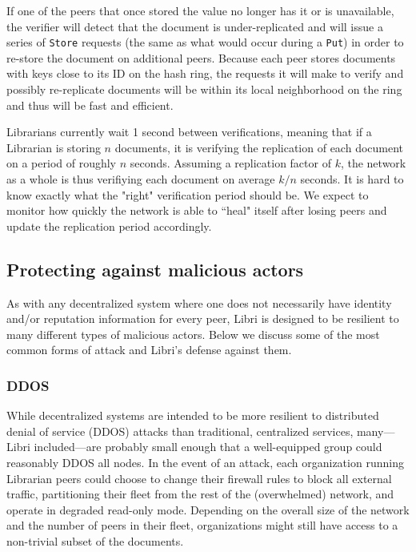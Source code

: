 \documentclass[10pt]{article}
\newcommand{\ttt}[1]{\texttt{#1}}
\begin{document}
If one of the peers that once stored the value no longer has it or is unavailable, the verifier will detect that the document is under-replicated and will issue a series of \ttt{Store} requests (the same as what would occur during a \texttt{Put}) in order to re-store the document on additional peers. Because each peer stores documents with keys close to its ID on the hash ring, the requests it will make to verify and possibly re-replicate documents will be within its local neighborhood on the ring and thus will be fast and efficient.

Librarians currently wait 1 second between verifications, meaning that if a Librarian is storing $n$ documents, it is verifying the replication of each document on a period of roughly $n$ seconds. Assuming a replication factor of $k$, the network as a whole is thus verifiying each document on average $k/n$ seconds. It is hard to know exactly what the "right" verification period should be. We expect to monitor how quickly the network is able to ``heal" itself after losing peers and update the replication period accordingly.

\subsection{Protecting against malicious actors}

As with any decentralized system where one does not necessarily have identity and/or reputation information for every peer, Libri is designed to be resilient to many different types of malicious actors. Below we discuss some of the most common forms of attack and Libri's defense against them. 

\subsubsection{DDOS}
While decentralized systems are intended to be more resilient to distributed denial of service (DDOS) attacks than traditional, centralized services, many---Libri included---are probably small enough that a well-equipped group could reasonably DDOS all nodes. In the event of an attack, each organization running Librarian peers could choose to change their firewall rules to block all external traffic, partitioning their fleet from the rest of the (overwhelmed) network, and operate in degraded read-only mode. Depending on the overall size of the network and the number of peers in their fleet, organizations might still have access to a non-trivial subset of the documents.
\end{document}
